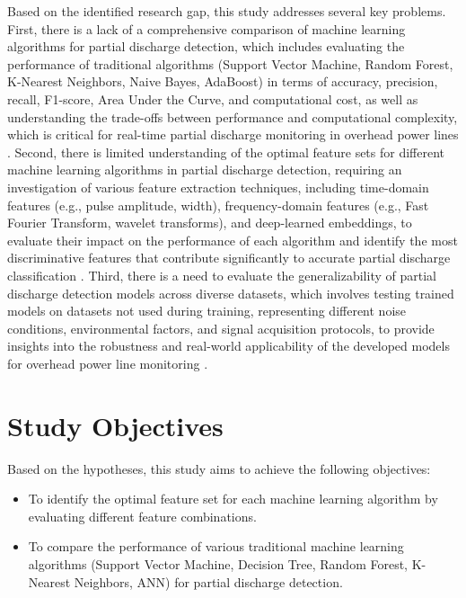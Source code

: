 Based on the identified research gap, this study addresses several key problems. First, there is a lack of a comprehensive comparison of machine learning algorithms for partial discharge detection, which includes evaluating the performance of traditional algorithms (Support Vector Machine, Random Forest, K-Nearest Neighbors, Naive Bayes, AdaBoost) in terms of accuracy, precision, recall, F1-score, Area Under the Curve, and computational cost, as well as understanding the trade-offs between performance and computational complexity, which is critical for real-time partial discharge monitoring in overhead power lines \parencite{Lu_2020_2, Kumar_2024_5}. Second, there is limited understanding of the optimal feature sets for different machine learning algorithms in partial discharge detection, requiring an investigation of various feature extraction techniques, including time-domain features (e.g., pulse amplitude, width), frequency-domain features (e.g., Fast Fourier Transform, wavelet transforms), and deep-learned embeddings, to evaluate their impact on the performance of each algorithm and identify the most discriminative features that contribute significantly to accurate partial discharge classification \parencite{Long_2024}. Third, there is a need to evaluate the generalizability of partial discharge detection models across diverse datasets, which involves testing trained models on datasets not used during training, representing different noise conditions, environmental factors, and signal acquisition protocols, to provide insights into the robustness and real-world applicability of the developed models for overhead power line monitoring \parencite{Raymond_2022}.

\section{Study Objectives}

Based on the hypotheses, this study aims to achieve the following objectives:
\begin{itemize}
    \item To identify the optimal feature set for each machine learning algorithm by evaluating different feature combinations.
    \item To compare the performance of various traditional machine learning algorithms (Support Vector Machine, Decision Tree, Random Forest, K-Nearest Neighbors, ANN) for partial discharge detection.
\end{itemize}


